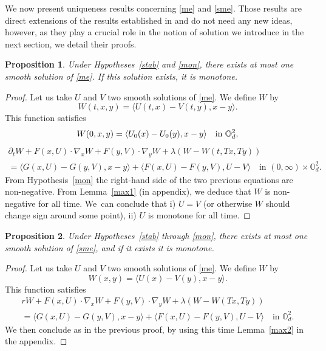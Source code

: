\documentclass[JEP,XML,SOM,Unicode,NoEqCountersInSection,published]{cedram}
\newtheorem{Prop}{Proposition}[section]
\theoremstyle{definition}
\begin{document}
We now present uniqueness results concerning \eqref{me} and \eqref{sme}. Those results are direct extensions of the results established in \cite{lions2007cours} and do not need any new ideas, however, as they play a crucial role in the notion of solution we introduce in the next section, we detail their proofs.
\begin{Prop}\label{uniq1}
Under Hypotheses~\ref{stab} and \ref{mon}, there exists at most one smooth solu\-tion of \eqref{me}. If this solution exists, it is monotone.
\end{Prop}
\begin{proof}
Let us take $U$ and $V$ two smooth solutions of \eqref{me}. We define $W$ by
\begin{equation*}
W(t,x,y) = \langle U(t,x)-V(t,y) , x-y \rangle.
\end{equation*}
This function satisfies
\begin{equation*}
W(0,x,y) = \langle U_0(x)-U_0(y), x-y\rangle \quad\text{in }\mathbb{O}_d^2,\vspace*{-5pt}
\end{equation*}
\begin{multline*}
\partial_t W+F(x,U)\cdot \nabla_x W+F(y,V)\cdot \nabla_y W+\lambda(W-W(t,Tx,Ty))\\
= \langle G(x,U)-G(y,V), x-y\rangle+\langle F(x,U)-F(y,V), U-V \rangle \quad\text{in } (0, \infty) \times \mathbb{O}_d^2.
\end{multline*}
From Hypothesis~\ref{mon} the right-hand side of the two previous equations are non-negative. From Lemma~\ref{max1} (in appendix), we deduce that $W$ is non-negative for all time. We~can conclude that i) $U = V$ (or otherwise $W$ should change sign around some point), ii) $U$ is monotone for all time.
\end{proof}
\begin{Prop}\label{uniq2}
Under Hypotheses~\ref{stab} through \ref{mon}, there exists at most one smooth solution of \eqref{sme}, and if it exists it is monotone.
\end{Prop}
\begin{proof}
Let us take $U$ and $V$ two smooth solutions of \eqref{me}. We define $W$ by
\begin{equation*}
W(x,y) = \langle U(x)-V(y) , x-y \rangle.
\end{equation*}
This function satisfies
\begin{multline*}
r W+F(x,U)\cdot \nabla_x W+F(y,V)\cdot \nabla_y W+\lambda(W-W(Tx,Ty))\\
= \langle G(x,U)-G(y,V), x-y\rangle+\langle F(x,U)-F(y,V), U-V \rangle \quad\text{in }\mathbb{O}_d^2.
\end{multline*}
We then conclude as in the previous proof, by using this time Lemma~\ref{max2} in the appendix.
\end{proof}
\end{document}
